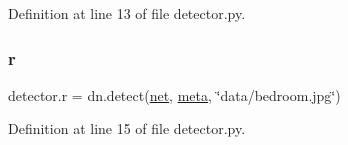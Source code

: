 Definition at line 13 of file detector.\+py.

\mbox{\label{namespacedetector_a1887c1b46d5441587cbf44391c466bf8}} 
\subsubsection{\texorpdfstring{r}{r}}
{\footnotesize\ttfamily detector.\+r = dn.\+detect(\mbox{\hyperlink{namespacedetector_a2d5cb51517045a5de5fc1b439ea5caf1}{net}}, \mbox{\hyperlink{namespacedetector_aedc2b8598b9d478706ca6e093b188642}{meta}}, \char`\"{}data/bedroom.\+jpg\char`\"{})}



Definition at line 15 of file detector.\+py.

